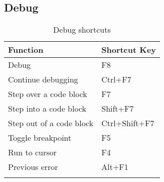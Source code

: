 \subsection{Debug}

{\small 
\begin{longtable}{|l|l|}\hline
\textbf{Function}		    &   \textbf{Shortcut Key}   \\ \hline
\endhead   %
Debug 	                    &   F8                      \\ \hline
Continue debugging 	        &   Ctrl+F7                 \\ \hline
Step over a code block 	    &   F7                      \\ \hline
Step into a code block 	    &   Shift+F7                \\ \hline
Step out of a code block 	&   Ctrl+Shift+F7           \\ \hline
Toggle breakpoint 	        &   F5                      \\ \hline
Run to cursor 	            &   F4                      \\ \hline
Previous error 	            &   Alt+F1                  \\ \hline
\caption{Debug shortcuts}
\end{longtable}
}